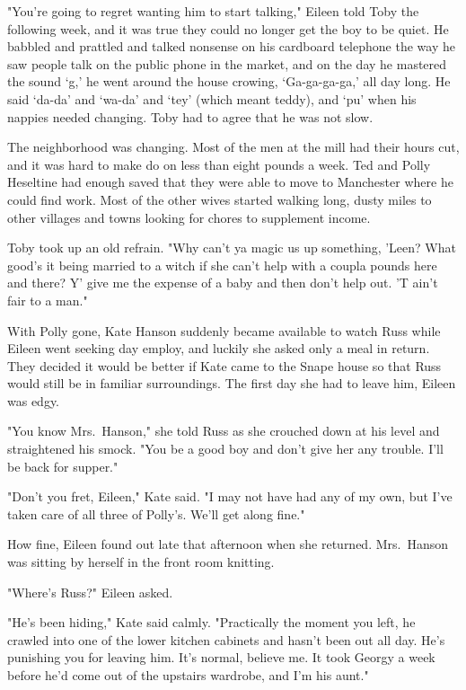 "You're going to regret wanting him to start talking," Eileen told Toby the following week, and it was true they could no longer get the boy to be quiet. He babbled and prattled and talked nonsense on his cardboard telephone the way he saw people talk on the public phone in the market, and on the day he mastered the sound `g,' he went around the house crowing, `Ga-ga-ga-ga,' all day long. He said `da-da' and `wa-da' and `tey' (which meant teddy), and `pu' when his nappies needed changing. Toby had to agree that he was not slow.

The neighborhood was changing. Most of the men at the mill had their hours cut, and it was hard to make do on less than eight pounds a week. Ted and Polly Heseltine had enough saved that they were able to move to Manchester where he could find work. Most of the other wives started walking long, dusty miles to other villages and towns looking for chores to supplement income.

Toby took up an old refrain. "Why can't ya magic us up something, 'Leen? What good's it being married to a witch if she can't help with a coupla pounds here and there? Y' give me the expense of a baby and then don't help out. 'T ain't fair to a man."

With Polly gone, Kate Hanson suddenly became available to watch Russ while Eileen went seeking day employ, and luckily she asked only a meal in return. They decided it would be better if Kate came to the Snape house so that Russ would still be in familiar surroundings. The first day she had to leave him, Eileen was edgy.

"You know Mrs.~Hanson," she told Russ as she crouched down at his level and straightened his smock. "You be a good boy and don't give her any trouble. I'll be back for supper."

"Don't you fret, Eileen," Kate said. "I may not have had any of my own, but I've taken care of all three of Polly's. We'll get along fine."

How fine, Eileen found out late that afternoon when she returned. Mrs.~Hanson was sitting by herself in the front room knitting.

"Where's Russ?" Eileen asked.

"He's been hiding," Kate said calmly. "Practically the moment you left, he crawled into one of the lower kitchen cabinets and hasn't been out all day. He's punishing you for leaving him. It's normal, believe me. It took Georgy a week before he'd come out of the upstairs wardrobe, and I'm his aunt."

